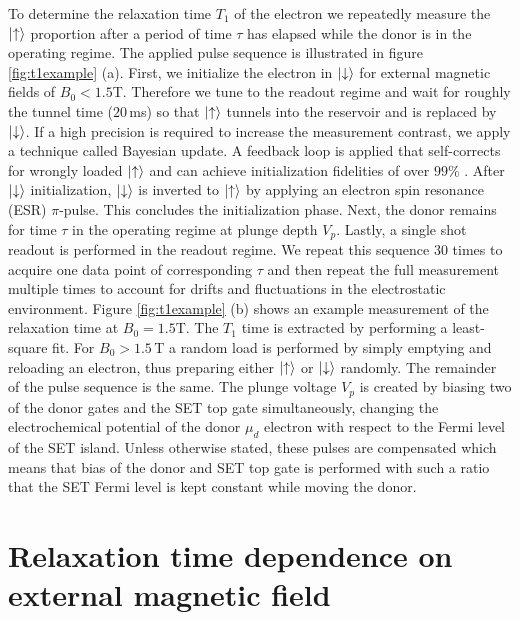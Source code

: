 To determine the relaxation time $T_1$ of the electron we repeatedly measure the $\ket{\uparrow}$ proportion after a period of time $\tau$ has elapsed while the donor is in the operating regime.  The applied pulse sequence is illustrated in figure \ref{fig:t1example} (a). First, we initialize the electron in $\ket{\downarrow}$ for external magnetic fields of $B_0<1.5$T. Therefore we tune to the readout regime and wait for roughly the tunnel time ($20\,$ms) so that $\ket{\uparrow}$ tunnels into the reservoir and is replaced by $\ket{\downarrow}$. If a high precision is required to increase the measurement contrast, we apply a technique called Bayesian update. A feedback loop is applied that self-corrects for wrongly loaded $\ket{\uparrow}$ and can achieve initialization fidelities of over $99\%$ \citep{Johnson2018}. After $\ket{\downarrow}$ initialization, $\ket{\downarrow}$ is inverted to $\ket{\uparrow}$ by applying an electron spin resonance (ESR) $\pi$-pulse. This concludes the initialization phase. Next, the donor remains for time $\tau$ in the operating regime at plunge depth $V_{p}$. Lastly, a single shot readout is performed in the readout regime. We repeat this sequence $30$ times to acquire one data point of corresponding $\tau$ and then repeat the full measurement multiple times to account for drifts and fluctuations in the electrostatic environment. Figure \ref{fig:t1example} (b) shows an example measurement of the relaxation time at $B_0=1.5$T. The $T_1$ time is extracted by performing a least-square fit. For $B_0>1.5\,$T a random load is performed by simply emptying and reloading an electron, thus preparing either $\ket{\uparrow}$ or $\ket{\downarrow}$ randomly. The remainder of the pulse sequence is the same. The plunge voltage $V_p$ is created by biasing two of the donor gates and the SET top gate simultaneously, changing the electrochemical potential of the donor $\mu_d$ electron with respect to the Fermi level of the SET island. Unless otherwise stated, these pulses are compensated which means that bias of the donor and SET top gate is performed with such a ratio that the SET Fermi level is kept constant while moving the donor. 


\section{Relaxation time dependence on external magnetic field} \label{sec:extB}

